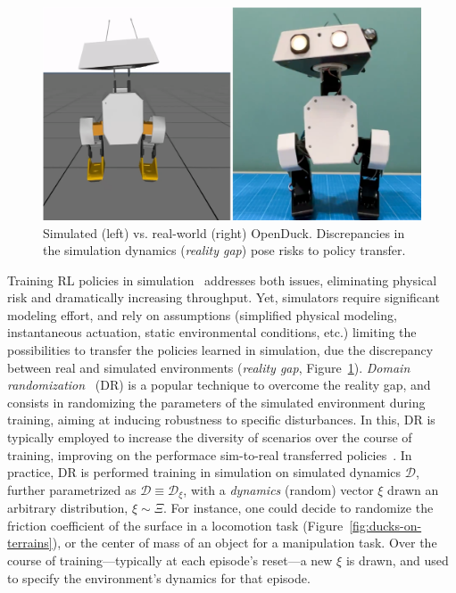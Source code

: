\begin{figure}
    \centering
    \includegraphics[width=0.7\linewidth]{figures/ch3/ch3-duck-sim-vs-real.png}
    \caption{Simulated (left) vs. real-world (right) OpenDuck. Discrepancies in the simulation dynamics (\emph{reality gap}) pose risks to policy transfer.}
    \label{fig:synthetic-vs-real-duck}
\end{figure}

Training RL policies in simulation~\citep{tobinDomainRandomizationTransferring2017} addresses both issues, eliminating physical risk and dramatically increasing throughput.
Yet, simulators require significant modeling effort, and rely on assumptions (simplified physical modeling, instantaneous actuation, static environmental conditions, etc.) limiting the possibilities to transfer the policies learned in simulation, due the discrepancy between real and simulated environments (\emph{reality gap}, Figure~\ref{fig:synthetic-vs-real-duck}).
\emph{Domain randomization}~\citep{tobinDomainRandomizationTransferring2017} (DR) is a popular technique to overcome the reality gap, and consists in randomizing the parameters of the simulated environment during training, aiming at inducing robustness to specific disturbances.
In this, DR is typically employed to increase the diversity of scenarios over the course of training, improving on the performace sim-to-real transferred policies~\citep{akkayaSolvingRubiksCube2019,antonovaReinforcementLearningPivoting2017,jiDribbleBotDynamicLegged2023}.
In practice, DR is performed training in simulation on simulated dynamics \( \mathcal D \), further parametrized as \( \mathcal D \equiv \mathcal D_\xi \), with a \emph{dynamics} (random) vector \( \xi \) drawn an arbitrary distribution, \( \xi \sim \Xi \).
For instance, one could decide to randomize the friction coefficient of the surface in a locomotion task (Figure~\ref{fig:ducks-on-terrains}), or the center of mass of an object for a manipulation task.
Over the course of training---typically at each episode's reset---a new \( \xi \) is drawn, and used to specify the environment's dynamics for that episode.

